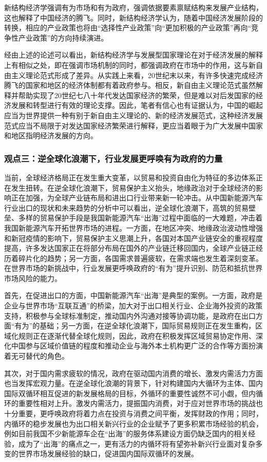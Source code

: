 \documentclass[a4paper, 10pt]{article}
\begin{document}
  新结构经济学强调有为市场和有为政府，强调依据要素禀赋结构来发展产业结构，这也解释了中国经济的腾飞。同时，新结构经济学认为，随着中国经济发展阶段的转换，相应的产业政策也将由“选择性产业政策”向“更加积极的产业政策”再向“竞争性产业政策”的方向持续演进。

  经由上述的论述可以看出，新结构经济学与发展型国家理论在对于经济发展的解释上有相似之处，即在强调市场机制的同时，都强调政府在市场中的作用，这与新自由主义理论范式形成了差异。从实践上来看，20世纪末以来，有许多快速完成经济腾飞的国家和地区的经济体制都有着政府参与。相反，新自由主义理论范式虽然解释并帮助实现了20世纪七八十年代发达国家经济的繁荣，但是难以对后发国家的经济发展和转型进行有效的理论支撑。因此，笔者有信心也有证据认为，中国的崛起应当为世界提供一种有别于新自由主义理论的、新的经济发展范式，这种经济发展范式应当不局限于对发达国家经济繁荣进行解释，更应当着眼于为广大发展中国家和地区指明经济发展的方向。
  \subsubsection{观点三：逆全球化浪潮下，行业发展更呼唤有为政府的力量}

  当前，全球经济格局正在发生重大变革，以贸易和投资自由化为特征的多边体系正在发生扭转。在逆全球化浪潮下，贸易保护主义抬头，地缘政治对于全球经济的影响正在加强，为全球产业链布局和进出口行业带来新一轮冲击。从中国新能源汽车行业出口的现状和未来趋势的分析中可以看出，逆全球化浪潮下，高筑的贸易壁垒、多样的贸易保护手段是我国新能源汽车“出海”过程中面临的一大难题，冲击着我国新能源汽车开拓世界市场的进程。一方面，在地区冲突、地缘政治波动性增强和新冠疫情的影响下，贸易保护主义思潮上升，各国对本国产业链安全的重视程度提高，许多发达国家正在将部分布局在国外的产业链迁移回国内，全球产业链正经历着碎片化的趋势；另一方面，各国需求普遍疲软，在需求端也发生着深刻变革。在世界市场的新挑战中，行业发展更呼唤政府的“有为”提升识别、防范和抵抗世界市场风险的能力。

  首先，在促进出口的方面，中国新能源汽车“出海”是典型的案例。一方面，政府是企业与世界市场“互联互通”的桥梁，加大对于出口相关行业、企业海外投资的政策支持，积极参与全球标准制定，推动国内外沟通对接等协调功能，是政府在出口方面“有为”的基础；另一方面，在逆全球化浪潮下，国际贸易规则正在发生重构，区域化规则正在逐渐代替全球化规则，因此，政府在积极发挥区域贸易协定作用、深化中国参与区域价值链的程度和推动企业与海外本土机构更广泛的合作等方面扮演着无可替代的角色。

  其次，对于国内需求疲软的情况，政府在驱动国内消费的增长、激发内需活力方面也当发挥宏观力量。在逆全球化浪潮的背景下，针对构建国内大循环为主体、国内国际双循环相互促进的新发展格局的目标，外循环的重要性诚然不可小觑，但内循环的重要性相对上升。激发内需活力，提振国内消费，对于应对世界市场的挑战也十分重要，更呼唤政府将着力点在投资与消费之间平衡，发挥财政的作用；同时，内循环的稳步发展也为出口相关新兴行业的企业赋予了更多积累市场经验的机会，例如目前我国不少新能源车企在“出海”的服务体系建设方面仍缺乏国内的相关经验，成为了“出海”的痛点之一，更有活力的内循环将有望弥补新兴行业面对复杂多变的世界市场发展经验的缺口，促进国内国际双循环的发展。
\end{document}
